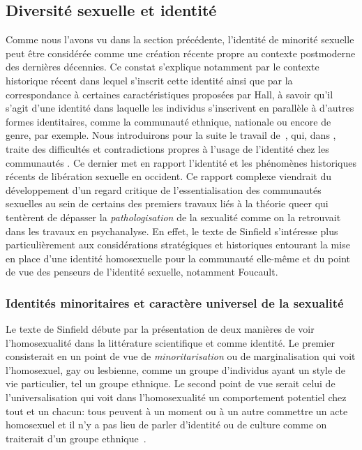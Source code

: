 \subsection{Diversité sexuelle et identité}
\label{sec:diversit_sexuelle_et_identit_} Comme nous l'avons vu dans la section précédente, l'identité de minorité sexuelle peut être considérée comme une création récente propre au contexte postmoderne des dernières décennies. 
Ce constat s'explique notamment par le contexte historique récent dans lequel s'inscrit cette identité ainsi que par la correspondance à certaines caractéristiques proposées par Hall, à savoir qu'il s'agit d'une identité dans laquelle les individus s'inscrivent en parallèle à d'autres formes identitaires, comme la communauté ethnique, nationale ou encore de genre, par exemple.
Nous introduirons pour la suite le travail de~\citet{Sinfield1996}, qui, dans , traite des difficultés et contradictions propres à l'usage de l'identité chez les communautés \lgbt{}.
Ce dernier met en rapport l'identité et les phénomènes historiques récents de libération sexuelle en occident.
Ce rapport complexe viendrait du développement d'un regard critique de l'essentialisation des communautés sexuelles au sein de certains des premiers travaux liés à la théorie queer qui tentèrent de dépasser la \emph{pathologisation} de la sexualité comme on la retrouvait dans les travaux en psychanalyse. 
En effet, le texte de Sinfield s'intéresse plus particulièrement aux considérations stratégiques et historiques entourant la mise en place d'une identité homosexuelle pour la communauté elle-même et du point de vue des penseurs de l'identité sexuelle, notamment Foucault.

\subsubsection{Identités minoritaires et caractère universel de la sexualité}
\label{sub:minorit_s_et_universel}
Le texte de Sinfield débute par la présentation de deux manières de voir l'homosexualité dans la littérature scientifique et comme identité.
Le premier consisterait en un point de vue de \emph{minoritarisation} ou de marginalisation qui voit l'homosexuel, gay ou lesbienne, comme un groupe d'individus ayant un style de vie particulier, tel un groupe ethnique.
Le second point de vue serait celui de l'universalisation qui voit dans l'homosexualité un comportement potentiel chez tout et un chacun: tous peuvent à un moment ou à un autre commettre un acte homosexuel et il n'y a pas lieu de parler d'identité ou de culture comme on traiterait d'un groupe ethnique~\citep[271]{Sinfield1996}.

